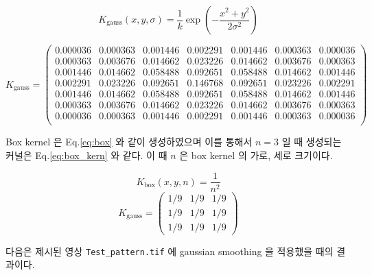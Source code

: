 \documentclass[a4paper, 12p]{paper}
\def\code#1{\texttt{#1}}
\begin{document}
\begin{equation}
  K_{\text{gauss}}(x, y, \sigma) = \frac{1}{k} \exp(-\frac{x^2 + y^2}{2 \sigma^2})\label{eq:gauss}
\end{equation}

\begin{equation}
  K_{\text{gauss}} =
  \begin{pmatrix}
     0.000036 & 0.000363 & 0.001446 & 0.002291 & 0.001446 & 0.000363 & 0.000036 \\
     0.000363 & 0.003676 & 0.014662 & 0.023226 & 0.014662 & 0.003676 & 0.000363 \\
     0.001446 & 0.014662 & 0.058488 & 0.092651 & 0.058488 & 0.014662 & 0.001446 \\
     0.002291 & 0.023226 & 0.092651 & 0.146768 & 0.092651 & 0.023226 & 0.002291 \\
     0.001446 & 0.014662 & 0.058488 & 0.092651 & 0.058488 & 0.014662 & 0.001446 \\
     0.000363 & 0.003676 & 0.014662 & 0.023226 & 0.014662 & 0.003676 & 0.000363 \\
     0.000036 & 0.000363 & 0.001446 & 0.002291 & 0.001446 & 0.000363 & 0.000036 \\
  \end{pmatrix}\label{eq:gauss_kern}
\end{equation}

Box kernel 은 Eq.\ref{eq:box} 와 같이 생성하였으며 이를 통해서 $n=3$ 일 때 생성되는 커널은 Eq.\ref{eq:box_kern} 와 같다. 이 때 $n$ 은 box kernel 의 가로, 세로 크기이다.

\begin{equation}
  K_{\text{box}}(x, y, n) = \frac{1}{n^2}\label{eq:box}
\end{equation}
\begin{equation}
  K_{\text{gauss}} =
  \begin{pmatrix}
     1/9 & 1/9 & 1/9 \\
     1/9 & 1/9 & 1/9 \\
     1/9 & 1/9 & 1/9
  \end{pmatrix}\label{eq:box_kern}
\end{equation}

다음은 제시된 영상 \code{Test\_pattern.tif} 에 gaussian smoothing 을 적용했을 때의 결과이다.
\end{document}
